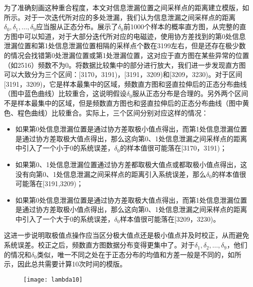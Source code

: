 {	为了准确刻画这种重合程度，本文对信息泄漏位置之间采样点的距离建立模版，如所示。对于一次迭代所对应的多处泄漏，我们认为信息泄漏之间采样点的距离$\delta_0,\delta_1,\dots,\delta_9$应当服从正态分布。展示了$\delta_0$前1000个样本的概率直方图，从完整的直方图中可以知道，对于大部分迭代所对应的电磁迹，使用协方差找到的第0处信息泄漏位置和第1处信息泄漏位置相隔的采样点个数在3199左右，但是还存在极少数的情况会找错第0处泄漏位置或第1处泄漏位置，这对应于直方图在某些异常的位置（如2516）频数不为0。将数据比较集中的部分进行放大，我们进一步发现直方图可以大致分为三个区间：[3170，3191)，[3191，3209)和[3209，3230)。对于区间[3191，3209)，它是样本最集中的区域，频数直方图和竖直拉伸后的正态分布曲线（图中蓝色曲线）比较重合，这说明假设$\delta_0$服从正态分布是合理的。另外两个区间不是样本最集中的区域，但是频数直方图也和竖直拉伸后的正态分布曲线（图中黄色、程色曲线）比较重合。实际上，三个区间分别对应这样的情况：
	
	\begin{itemize}
		\item 如果第0处信息泄漏位置是通过协方差取极小值点得出，而第1处信息泄漏位置是通过协方差取极大值点得出，那么这向第0、1处信息泄漏之间采样点的距离中引入了一个小于0的系统误差，$\delta_0$的样本值很可能落在[3170，3191)；
		\item 如果第0、1处信息泄漏位置通过协方差都取极大值点或都取极小值点得出，这没有向第0、1处信息泄漏之间采样点的距离引入系统误差，那么$\delta_0$的样本值很可能落在[3191,3209)；
		\item 如果第0处信息泄漏位置是通过协方差取极大值点得出，而第1处信息泄漏位置是通过协方差取极小值点得出，那么这向第0、1处信息泄漏之间采样点的距离中引入了一个大于0的系统误差，$\delta_0$样本值很可能落在[3209，3230)。
	\end{itemize}

	这进一步说明取极值点操作应当区分极大值点还是极小值点并及时校正，从而避免系统误差。校正之后，频数直方图数据分布变得更集中了。对于$\delta_1,\delta_2,\dots,\delta_9$，他们的情况和$\delta_0$类似，唯一不同之处在于正态分布的均值和方差一般是不同的，如所示，因此总共需要计算10次时间的模版。
	
	
	\begin{figure}[!h]
		\begin{center}
			\texttt{[image: lambda10]}
			\label{fig:lambda10}
		\end{center}
	\end{figure}
	
}
